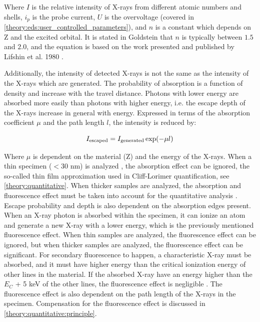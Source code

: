 Where $I$ is the relative intensity of X-rays from different atomic numbers and shells, $i_p$ is the probe current, $U$ is the overvoltage (covered in \cref{theory:eds:user_controlled_parameters}), and $n$ is a constant which depends on Z and the excited orbital.
It is stated in Goldstein that $n$ is typically between $1.5$ and $2.0$, and the equation is based on the work presented and published by Lifshin et al. 1980 \cite{lifshin1980}.



Additionally, the intensity of detected X-rays is not the same as the intensity of the X-rays which are generated.
The probability of absorption is a function of density and increase with the travel distance.
Photons with lower energy are absorbed more easily than photons with higher energy, i.e. the escape depth of the X-rays increase in general with energy.
Expressed in terms of the absorption coefficient $\mu$ and the path length $l$, the intensity is reduced by:

\begin{equation}
    \label{eq:theory:xray_formation:escape}
    I_{\textnormal{escaped}} = I_{\textnormal{generated}} \exp(-\mu l)
\end{equation}

Where $\mu$ is dependent on the material (Z) and the energy of the X-rays.
When a thin specimen ($<30$ nm) is analyzed \cite{watanabe_williams_zeta_2006}, the absorption effect can be ignored, the so-called thin film approximation used in Cliff-Lorimer quantification, see \cref{theory:quantitative}.
When thicker samples are analyzed, the absorption and fluorescence effect must be taken into account for the quantitative analysis \cite{goldstein_scanning_2018}.
Escape probability and depth is also dependent on the absorption edges present.
When an X-ray photon is absorbed within the specimen, it can ionize an atom and generate a new X-ray with a lower energy, which is the previously mentioned fluorescence effect.
When thin samples are analyzed, the fluorescence effect can be ignored, but when thicker samples are analyzed, the fluorescence effect can be significant.
For secondary fluorescence to happen, a characteristic X-ray must be absorbed, and it must have higher energy than the critical ionization energy of other lines in the material.
If the absorbed X-ray have an energy higher than the $E_C$ + 5 keV of the other lines, the fluorescence effect is negligible \cite[p. 306]{goldstein_scanning_2018}.
The fluorescence effect is also dependent on the path length of the X-rays in the specimen.
Compensation for the fluorescence effect is discussed in \cref{theory:quantitative:principle}.









